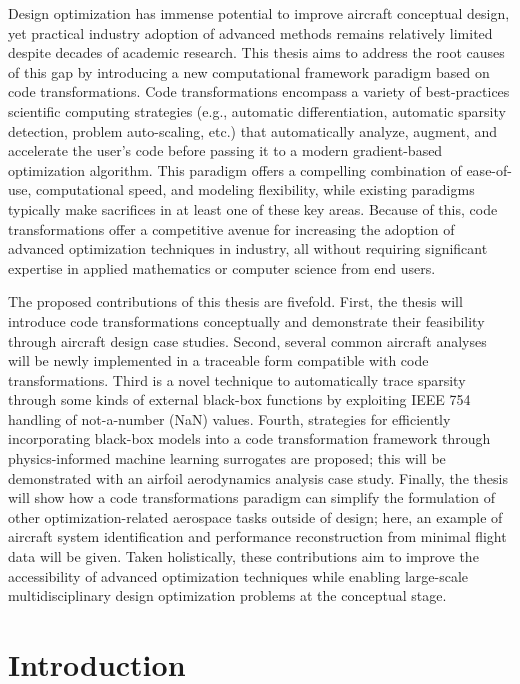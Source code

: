 \documentclass[12pt,vi,oneside]{report}
\begin{document}
    Design optimization has immense potential to improve aircraft conceptual design, yet practical industry adoption of advanced methods remains relatively limited despite decades of academic research. This thesis aims to address the root causes of this gap by introducing a new computational framework paradigm based on code transformations. Code transformations encompass a variety of best-practices scientific computing strategies (e.g., automatic differentiation, automatic sparsity detection, problem auto-scaling, etc.) that automatically analyze, augment, and accelerate the user's code before passing it to a modern gradient-based optimization algorithm. This paradigm offers a compelling combination of ease-of-use, computational speed, and modeling flexibility, while existing paradigms typically make sacrifices in at least one of these key areas. Because of this, code transformations offer a competitive avenue for increasing the adoption of advanced optimization techniques in industry, all without requiring significant expertise in applied mathematics or computer science from end users.

    The proposed contributions of this thesis are fivefold. First, the thesis will introduce code transformations conceptually and demonstrate their feasibility through aircraft design case studies. Second, several common aircraft analyses will be newly implemented in a traceable form compatible with code transformations. Third is a novel technique to automatically trace sparsity through some kinds of external black-box functions by exploiting IEEE 754 handling of not-a-number (NaN) values. Fourth, strategies for efficiently incorporating black-box models into a code transformation framework through physics-informed machine learning surrogates are proposed; this will be demonstrated with an airfoil aerodynamics analysis case study. Finally, the thesis will show how a code transformations paradigm can simplify the formulation of other optimization-related aerospace tasks outside of design; here, an example of aircraft system identification and performance reconstruction from minimal flight data will be given. Taken holistically, these contributions aim to improve the accessibility of advanced optimization techniques while enabling large-scale multidisciplinary design optimization problems at the conceptual stage.

    \tableofcontents


    \chapter{Introduction}
    \label{sec:intro}
\end{document}
